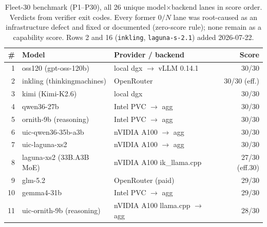 
\begin{table}[t]
  \centering
  \footnotesize
  \caption{Fleet-30 benchmark (P1--P30), all 26 unique model$\times$backend lanes in
    score order. Verdicts from verifier exit codes. Every former $0/N$ lane was
    root-caused as an infrastructure defect and fixed or documented (zero-score rule);
    none remain as a capability score. Rows 2 and 16 (\texttt{inkling},
    \texttt{laguna-s-2.1}) added 2026-07-22.}
  \label{tab:fleet30}
  \begin{tabular}{rllr}
    \toprule
    \# & Model & Provider / backend & Score \\
    \midrule
    1  & oss120 (gpt-oss-120b)         & local dgx $\to$ vLLM 0.14.1        & 30/30 \\
    2  & inkling (thinkingmachines)    & OpenRouter                        & 30/30 (eff.) \\
    3  & kimi (Kimi-K2.6)              & local dgx                         & 30/30 \\
    4  & qwen36-27b                    & Intel PVC $\to$ agg               & 30/30 \\
    5  & ornith-9b (reasoning)         & Intel PVC $\to$ agg               & 30/30 \\
    6  & uic-qwen36-35b-a3b            & nVIDIA A100 $\to$ agg             & 30/30 \\
    7  & uic-laguna-xs2                & nVIDIA A100 $\to$ agg             & 30/30 \\
    8  & laguna-xs2 (33B.A3B MoE)      & nVIDIA A100 ik\_llama.cpp         & 27/30 (eff.30) \\
    9  & glm-5.2                       & OpenRouter (paid)                 & 29/30 \\
    10 & gemma4-31b                    & Intel PVC $\to$ agg               & 29/30 \\
    11 & uic-ornith-9b (reasoning)     & nVIDIA A100 llama.cpp $\to$ agg   & 28/30 \\

\end{tabular}
\end{table}
